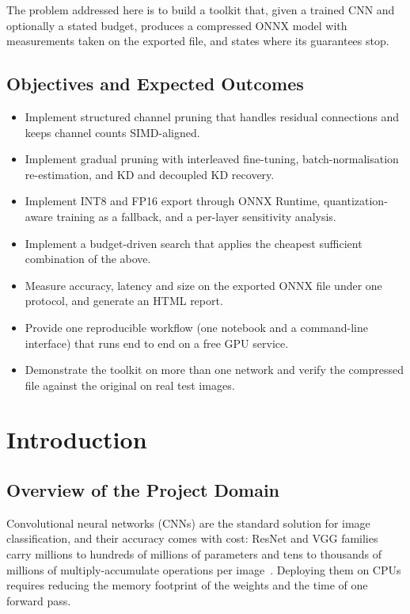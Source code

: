 \documentclass[oneside,a4paper,12pt]{report}
\begin{document}
The problem addressed here is to build a toolkit that, given a trained CNN and optionally a stated budget, produces a compressed ONNX model with measurements taken on the exported file, and states where its guarantees stop.

\section{Objectives and Expected Outcomes}
\begin{itemize}
\item Implement structured channel pruning that handles residual connections and keeps channel counts SIMD-aligned.
\item Implement gradual pruning with interleaved fine-tuning, batch-normalisation re-estimation, and KD and decoupled KD recovery.
\item Implement INT8 and FP16 export through ONNX Runtime, quantization-aware training as a fallback, and a per-layer sensitivity analysis.
\item Implement a budget-driven search that applies the cheapest sufficient combination of the above.
\item Measure accuracy, latency and size on the exported ONNX file under one protocol, and generate an HTML report.
\item Provide one reproducible workflow (one notebook and a command-line interface) that runs end to end on a free GPU service.
\item Demonstrate the toolkit on more than one network and verify the compressed file against the original on real test images.
\end{itemize}



\chapter{Introduction}
\section{Overview of the Project Domain}
Convolutional neural networks (CNNs) are the standard solution for image classification, and their accuracy comes with cost: ResNet and VGG families carry millions to hundreds of millions of parameters and tens to thousands of millions of multiply-accumulate operations per image~\cite{he2016,simonyan2015}. Deploying them on CPUs requires reducing the memory footprint of the weights and the time of one forward pass.
\end{document}
